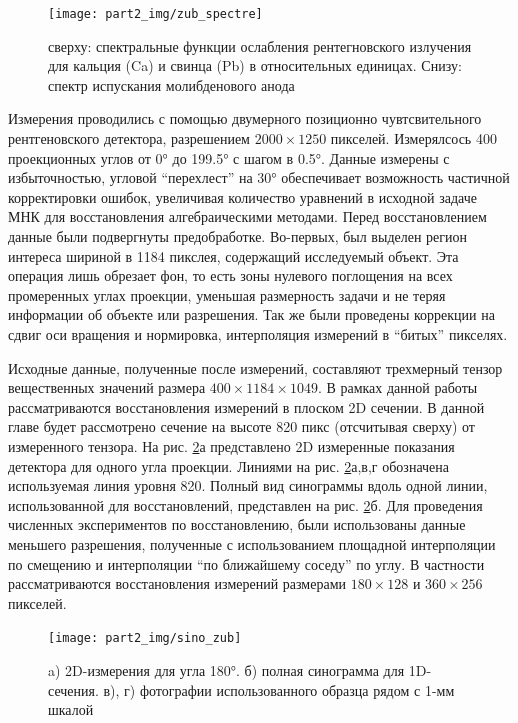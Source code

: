 \begin{figure}
    \centering
    \texttt{[image: part2\_img/zub\_spectre]} \\
    \caption{сверху: спектральные функции ослабления рентегновского излучения для кальция (Ca) и свинца (Pb) в относительных единицах. Снизу: спектр испускания молибденового анода}
    \label{fig:zub_spectre}
\end{figure}

Измерения проводились с помощью двумерного позиционно чувтсвительного рентгеновского детектора, разрешением $2000 \times 1250$ пикселей.
Измерялсось 400 проекционных углов от \ang{0} до \ang{199.5} с шагом в \ang{0.5}.
Данные измерены с избыточностью, угловой ``перехлест'' на \ang{30} обеспечивает возможность частичной корректировки ошибок, увеличивая количество уравнений в исходной задаче МНК для восстановления алгебраическими методами.
Перед восстановлением данные были подвергнуты предобработке.
Во-первых, был выделен регион интереса шириной в 1184 пикслея, содержащий исследуемый объект.
Эта операция лишь обрезает фон, то есть зоны нулевого поглощения на всех промеренных углах проекции, уменьшая размерность задачи и не теряя информации об объекте или разрешения.
Так же были проведены коррекции на сдвиг оси вращения и нормировка, интерполяция измерений в ``битых'' пикселях.

Исходные данные, полученные после измерений, составляют трехмерный тензор вещественных значений размера $400 \times 1184 \times 1049$.
В рамках данной работы рассматриваются восстановления измерений в плоском 2D сечении.
В данной главе будет рассмотрено сечение на высоте 820 пикс (отсчитывая сверху) от измеренного тензора.
На рис. \ref{fig:sino_zub}а представлено 2D измеренные показания детектора для одного угла проекции.
Линиями на рис. \ref{fig:sino_zub}а,в,г обозначена используемая линия уровня 820.
Полный вид синограммы вдоль одной линии, использованной для восстановлений, представлен на рис. \ref{fig:sino_zub}б.
Для проведения численных экспериментов по восстановлению, были использованы данные меньшего разрешения, полученные с использованием площадной интерполяции по смещению и интерполяции ``по ближайшему соседу'' по углу.
В частности рассматриваются восстановления измерений размерами $180 \times 128$ и $360 \times 256$ пикселей.

\begin{figure}
    \centering
    \texttt{[image: part2\_img/sino\_zub]} \\
    \caption{a) 2D-измерения для угла \ang{180}. б) полная синограмма для 1D-сечения. в), г) фотографии использованного образца рядом с 1-мм шкалой}
    \label{fig:sino_zub}
\end{figure}

